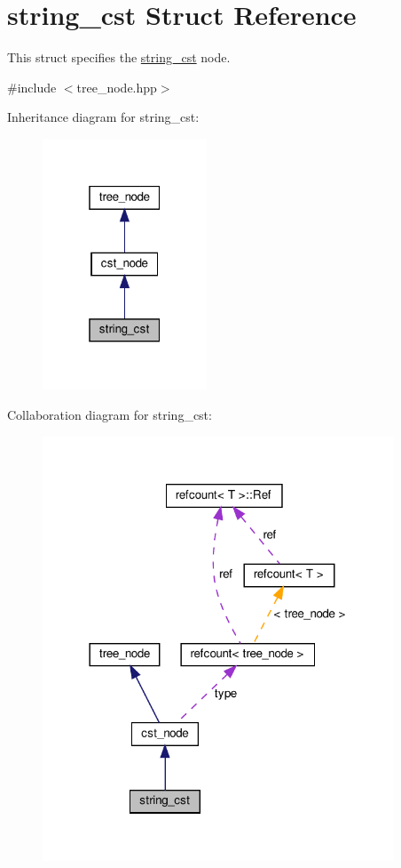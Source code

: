 \hypertarget{structstring__cst}{}\section{string\+\_\+cst Struct Reference}
\label{structstring__cst}


This struct specifies the \hyperlink{structstring__cst}{string\+\_\+cst} node.  




{\ttfamily \#include $<$tree\+\_\+node.\+hpp$>$}



Inheritance diagram for string\+\_\+cst\+:
\nopagebreak
\begin{figure}[H]
\begin{center}
\leavevmode
\includegraphics[width=139pt]{d9/d83/structstring__cst__inherit__graph}
\end{center}
\end{figure}


Collaboration diagram for string\+\_\+cst\+:
\nopagebreak
\begin{figure}[H]
\begin{center}
\leavevmode
\includegraphics[width=297pt]{db/da7/structstring__cst__coll__graph}
\end{center}
\end{figure}
